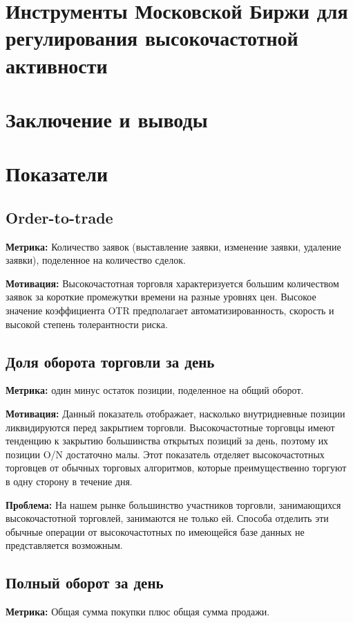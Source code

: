 \documentclass{article}
\begin{document}
\section{Инструменты Московской Биржи для регулирования высокочастотной активности}
\section{Заключение и выводы}

\newpage

\section*{Показатели}

	\subsection*{Order-to-trade}
		\noindent
		\textbf{Метрика:} Количество заявок (выставление заявки, изменение заявки, удаление заявки), поделенное на количество сделок.

		\noindent
		\textbf{Мотивация:} Высокочастотная торговля характеризуется большим количеством заявок за короткие промежутки времени на разные уровнях цен. Высокое значение коэффициента OTR предполагает автоматизированность, скорость и высокой степень толерантности риска.

	\subsection*{Доля оборота торговли за день}
		\noindent
		\textbf{Метрика:} один минус остаток позиции, поделенное на общий оборот.
		
		\noindent
		\textbf{Мотивация:} Данный показатель отображает, насколько внутридневные позиции ликвидируются перед закрытием торговли. Высокочастотные торговцы имеют тенденцию к закрытию большинства открытых позиций за день, поэтому их позиции O/N достаточно малы. Этот показатель отделяет высокочастотных торговцев от обычных торговых алгоритмов, которые преимущественно торгуют в одну сторону в течение дня.

		\noindent
		\textbf{Проблема:} На нашем рынке большинство участников торговли, занимающихся высокочастотной торговлей, занимаются не только ей. Способа отделить эти обычные операции от высокочастотных по имеющейся базе данных не представляется возможным.

	\subsection*{Полный оборот за день}
		\noindent
		\textbf{Метрика:} Общая сумма покупки плюс общая сумма продажи.
\end{document}

